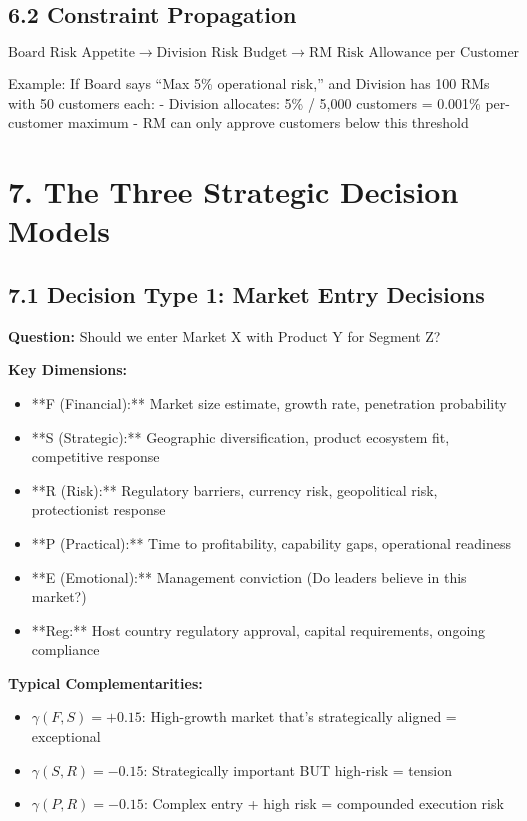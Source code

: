 \documentclass[11pt]{article}
\begin{document}
\subsection{6.2 Constraint Propagation}

\begin{equation}
\text{Board Risk Appetite} \rightarrow \text{Division Risk Budget} \rightarrow \text{RM Risk Allowance per Customer}
\end{equation}

Example: If Board says ``Max 5\% operational risk,'' and Division has 100 RMs with 50 customers each:
- Division allocates: 5\% / 5,000 customers = 0.001\% per-customer maximum
- RM can only approve customers below this threshold

\section{7. The Three Strategic Decision Models}

\subsection{7.1 Decision Type 1: Market Entry Decisions}

\textbf{Question:} Should we enter Market X with Product Y for Segment Z?

\textbf{Key Dimensions:}
\begin{itemize}
\item **F (Financial):** Market size estimate, growth rate, penetration probability
\item **S (Strategic):** Geographic diversification, product ecosystem fit, competitive response
\item **R (Risk):** Regulatory barriers, currency risk, geopolitical risk, protectionist response
\item **P (Practical):** Time to profitability, capability gaps, operational readiness
\item **E (Emotional):** Management conviction (Do leaders believe in this market?)
\item **Reg:** Host country regulatory approval, capital requirements, ongoing compliance
\end{itemize}

\textbf{Typical Complementarities:}
\begin{itemize}
\item $\gamma(F, S) = +0.15$: High-growth market that's strategically aligned = exceptional
\item $\gamma(S, R) = -0.15$: Strategically important BUT high-risk = tension
\item $\gamma(P, R) = -0.15$: Complex entry + high risk = compounded execution risk
\end{itemize}
\end{document}

